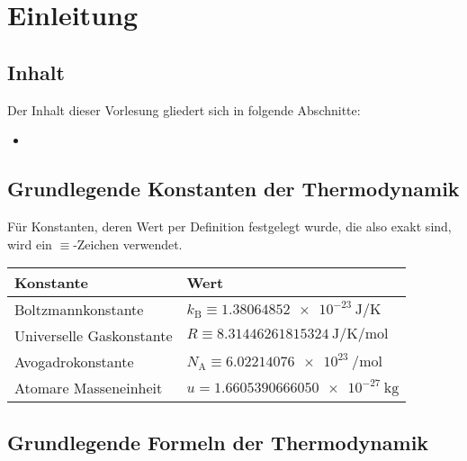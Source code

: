 
\chapter{Einleitung\label{einleitung}}



\section{Inhalt}

Der Inhalt dieser Vorlesung gliedert sich in folgende Abschnitte:

\begin{itemize}
	\item
\end{itemize}



\section{Grundlegende Konstanten der Thermodynamik}

Für Konstanten, deren Wert per Definition festgelegt wurde, die also exakt sind, wird ein $\equiv $-Zeichen verwendet.


\begin{table}[H]
	\centering
	\begin{tabular}{|l|l|} \hline
		\textbf{Konstante}         & \textbf{Wert}                                                     \\\hline
		
		Boltzmannkonstante & \centering\arraybackslash{}$k_\mathrm{B}\equiv \SI{1,38064852e-23}{\joule\per\kelvin}$ \\
		Universelle Gaskonstante & \centering\arraybackslash{}$R\equiv \SI{8,31446261815324}{\joule\per\kelvin\per\mole}$ \\
		Avogadrokonstante & \centering\arraybackslash{}$N_\mathrm{A}\equiv \SI{6,02214076e23}{\per\mole}$ \\
		Atomare Masseneinheit & \centering\arraybackslash{}$u= \SI{1,6605390666050e-27}{\kg}$ \\
		\hline
	\end{tabular}
\end{table}




\section{Grundlegende Formeln der Thermodynamik}
